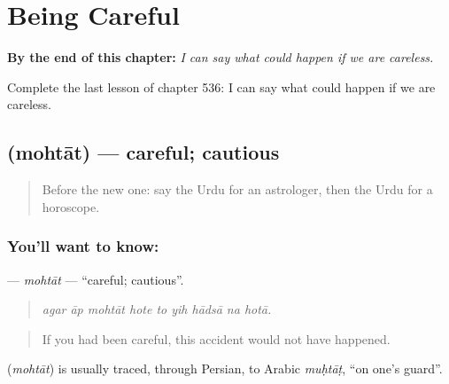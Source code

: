 
\chapter{Being Careful}
\label{ch:ur-being-careful}

\begin{chapteropening}
\textbf{By the end of this chapter:} \emph{I can say what could happen if we are careless.}

Complete the last lesson of chapter 536: I can say what could happen if we are careless.
\end{chapteropening}

\section[\texorpdfstring{\ur{محتاط} (mohtāt)}{محتاط (mohtāt)}]{ (mohtāt) — careful; cautious}

\label{lesson:UR-C536-mohtat}



\begin{quote}
Before the new one: say the Urdu for an astrologer, then the Urdu for a horoscope.
\end{quote}

\subsection*{You'll want to know: }
\textbf{} — \emph{mohtāt} — \textquotedblleft{}careful; cautious\textquotedblright{}.

\begin{quote}
        
\end{quote}

\begin{quote}
\emph{agar āp mohtāt hote to yih hādsā na hotā.}
\end{quote}

\begin{quote}
If you had been careful, this accident would not have happened.
\end{quote}

\begin{cousinweb}
\textbf{} (\emph{mohtāt}) is usually traced, through Persian, to Arabic \emph{muḥtāṭ}, \textquotedblleft{}on one's guard\textquotedblright{}.
\end{cousinweb}

